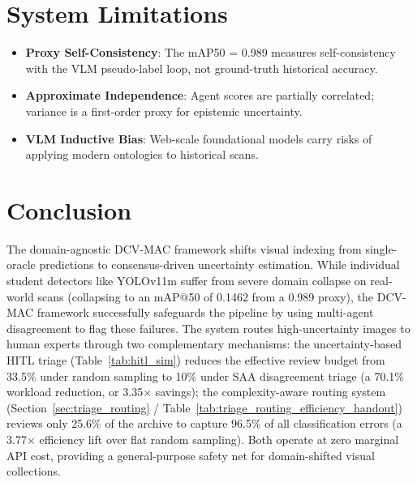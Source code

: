 \documentclass[11pt,a4paper]{article}
\newcommand{\term}[1]{\textbf{#1}}
\begin{document}
\section{System Limitations}
\begin{itemize}[leftmargin=*, noitemsep]
    \item \term{Proxy Self-Consistency}: The mAP50 = 0.989 measures self-consistency with the VLM pseudo-label loop, not ground-truth historical accuracy.
    \item \term{Approximate Independence}: Agent scores are partially correlated; variance is a first-order proxy for epistemic uncertainty.
    \item \term{VLM Inductive Bias}: Web-scale foundational models carry risks of applying modern ontologies to historical scans.
\end{itemize}

\section{Conclusion}
The domain-agnostic DCV-MAC framework shifts visual indexing from single-oracle predictions to consensus-driven uncertainty estimation. While individual student detectors like YOLOv11m suffer from severe domain collapse on real-world scans (collapsing to an mAP@50 of 0.1462 from a 0.989 proxy), the DCV-MAC framework successfully safeguards the pipeline by using multi-agent disagreement to flag these failures. The system routes high-uncertainty images to human experts through two complementary mechanisms: the uncertainty-based HITL triage (Table~\ref{tab:hitl_sim}) reduces the effective review budget from 33.5\% under random sampling to 10\% under SAA disagreement triage (a 70.1\% workload reduction, or 3.35$\times$ savings); the complexity-aware routing system (Section~\ref{sec:triage_routing} / Table~\ref{tab:triage_routing_efficiency_handout}) reviews only 25.6\% of the archive to capture 96.5\% of all classification errors (a 3.77$\times$ efficiency lift over flat random sampling). Both operate at zero marginal API cost, providing a general-purpose safety net for domain-shifted visual collections.
\end{document}
